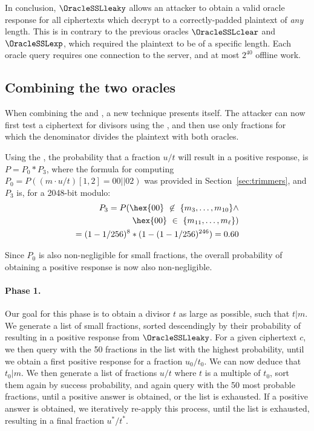 In conclusion, $\OracleSSLleaky$ allows an attacker to obtain a valid oracle response
for all ciphertexts which decrypt to a correctly-padded plaintext of \textit{any} length. This is in contrary to the previous oracles $\OracleSSLclear$ and $\OracleSSLexp$, which required the plaintext to be of a specific length.
Each oracle query requires one \ssltwo connection to the server,
and at most $2^{40}$ offline work.


\subsection{Combining the two oracles}
When combining the \tOracleSSLclear and \tOracleSSLleaky, a new technique
presents itself.
The attacker can now first test a \tlsconform ciphertext for divisors
using the \tOracleSSLleaky,
and then use only fractions for which the denominator divides the plaintext
with both oracles.

Using the \tOracleSSLleaky, the probability that a fraction $u/t$ will result
in a positive response, is $P = P_0 * P_3$, where the formula for
computing $P_0 = P((m \cdot u/t)[1,2] = 00||02)$ was provided in Section~\ref{sec:trimmers},
and $P_3$ is, for a 2048-bit modulo:
\begin{equation}
\begin{aligned}
P_3 = P(
\hex{00} \text{ } \not \in \text{ } \{m_3, \ldots,m_{10}\} \wedge \\
\hex{00} \text{ } \in \text{ } \{m_{11}, \ldots,m_{\ell}\}) \\
 = (1 - 1/256)^{8} * (1 - (1 - 1/256)^{246}) = 0.60
\end{aligned}
\end{equation}

Since $P_0$ is also non-negligible for small fractions, the overall probability of
obtaining a positive response is now also non-negligible.

\paragraph{Phase 1.}
Our goal for this phase is to obtain a divisor $t$ as large as possible,
such that $t|m$. We generate a list of small
fractions, sorted descendingly by their probability of
resulting in a positive response from $\OracleSSLleaky$. For a given ciphertext $c$, we then query with
the 50 fractions in the list with the highest probability,
until we obtain a first positive response for a fraction $u_0/t_0$.
We can now deduce that $t_0|m$.
We then generate a list of fractions $u/t$ where $t$ is a multiple of $t_0$, sort them again
by success probability, and again query with the 50 most probable fractions, until a positive answer is obtained,
or the list is exhausted.
If a positive answer is obtained, we iteratively re-apply this process,
until the list is exhausted, resulting in a final fraction $u^*/t^*$.


